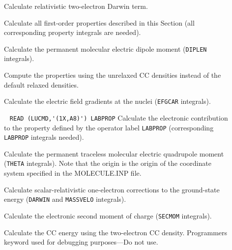\begin{description}
\item[] 
        Calculate relativistic two-electron Darwin term.
%
\item[] 
        Calculate all first-order properties described in this Section 
        (all corresponding property integrals are needed).
%
\item[] 
        Calculate the permanent molecular electric dipole moment
        (\verb+DIPLEN+ integrals).
%
\item[] 
        Compute the properties using the unrelaxed CC densities instead
        of the default relaxed densities.
%
\item[] 
        Calculate the electric field gradients at the nuclei
        (\verb+EFGCAR+ integrals).
%
\item[] \verb| |\newline
\verb|READ (LUCMD,'(1X,A8)') LABPROP|\newline
        Calculate the electronic contribution to the property defined
        by the operator label \verb+LABPROP+ (corresponding 
        \verb+LABPROP+ integrals needed).
%
\item[] 
        Calculate the permanent traceless molecular electric
        quadrupole moment (\verb+THETA+ integrals). Note that the
        origin is the origin of the coordinate system specified
        in the MOLECULE.INP file.
%
\item[] 
        Calculate scalar-relativistic one-electron
        corrections to the ground-state
        energy (\verb+DARWIN+ and \verb+MASSVELO+ integrals).
%
\item[] 
        Calculate the electronic second moment of charge
        (\verb+SECMOM+ integrals).
%
\item[] 
        Calculate the CC energy using the two-electron CC density.
        Programmers keyword used for debugging purposes---Do not use.
%
\end{description}
